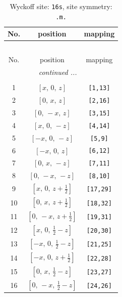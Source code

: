 \documentclass[fleqn,8pt]{jsarticle}
\begin{document}
\renewcommand{\arraystretch}{1.2}
\begin{longtable}{ccc}
\caption{Wyckoff site: {\tt 16s}, site symmetry: {\tt .m.}}
 \\
 \hline \hline
No. & position & mapping \\ \hline \endfirsthead

\multicolumn{2}{l}{\tablename\ \thetable{}} \\
 \hline \hline
No. & position & mapping \\ \hline \endhead

 \hline \hline
\multicolumn{2}{r}{\footnotesize\it continued ...} \\ \endfoot

 \hline \hline
\multicolumn{2}{r}{} \\ \endlastfoot

1 & $\left[ x,\, 0,\, z \right]$ & {\tt [1,13]} \\ \hline
2 & $\left[ 0,\, x,\, z \right]$ & {\tt [2,16]} \\ \hline
3 & $\left[ 0,\, - x,\, z \right]$ & {\tt [3,15]} \\ \hline
4 & $\left[ x,\, 0,\, - z \right]$ & {\tt [4,14]} \\ \hline
5 & $\left[ - x,\, 0,\, - z \right]$ & {\tt [5,9]} \\ \hline
6 & $\left[ - x,\, 0,\, z \right]$ & {\tt [6,12]} \\ \hline
7 & $\left[ 0,\, x,\, - z \right]$ & {\tt [7,11]} \\ \hline
8 & $\left[ 0,\, - x,\, - z \right]$ & {\tt [8,10]} \\ \hline
9 & $\left[ x,\, 0,\, z + \frac{1}{2} \right]$ & {\tt [17,29]} \\ \hline
10 & $\left[ 0,\, x,\, z + \frac{1}{2} \right]$ & {\tt [18,32]} \\ \hline
11 & $\left[ 0,\, - x,\, z + \frac{1}{2} \right]$ & {\tt [19,31]} \\ \hline
12 & $\left[ x,\, 0,\, \frac{1}{2} - z \right]$ & {\tt [20,30]} \\ \hline
13 & $\left[ - x,\, 0,\, \frac{1}{2} - z \right]$ & {\tt [21,25]} \\ \hline
14 & $\left[ - x,\, 0,\, z + \frac{1}{2} \right]$ & {\tt [22,28]} \\ \hline
15 & $\left[ 0,\, x,\, \frac{1}{2} - z \right]$ & {\tt [23,27]} \\ \hline
16 & $\left[ 0,\, - x,\, \frac{1}{2} - z \right]$ & {\tt [24,26]} \\
\end{longtable}
\end{document}
